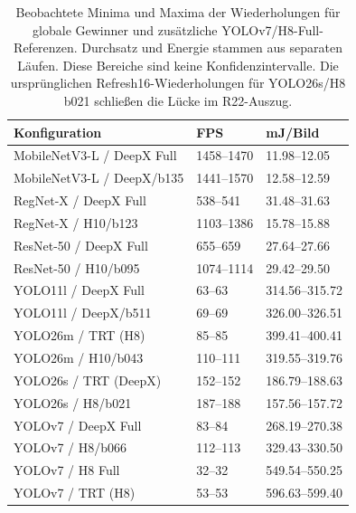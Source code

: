 \begin{table}[t]
\centering
\caption{Beobachtete Minima und Maxima der Wiederholungen für globale Gewinner und zusätzliche YOLOv7/H8-Full-Referenzen. Durchsatz und Energie stammen aus separaten Läufen. Diese Bereiche sind keine Konfidenzintervalle. Die ursprünglichen Refresh16-Wiederholungen für YOLO26s/H8 b021 schließen die Lücke im R22-Auszug.}
\label{tab:winner-repeat-ranges}
\begingroup\small\setlength{\tabcolsep}{3pt}
\begin{tabular*}{\columnwidth}{@{\extracolsep{\fill}}l l l@{}}
\toprule
Konfiguration & FPS & mJ/Bild \\
\midrule
MobileNetV3-L / DeepX Full & 1458--1470 & 11.98--12.05 \\
MobileNetV3-L / DeepX/b135 & 1441--1570 & 12.58--12.59 \\
RegNet-X / DeepX Full & 538--541 & 31.48--31.63 \\
RegNet-X / H10/b123 & 1103--1386 & 15.78--15.88 \\
ResNet-50 / DeepX Full & 655--659 & 27.64--27.66 \\
ResNet-50 / H10/b095 & 1074--1114 & 29.42--29.50 \\
YOLO11l / DeepX Full & 63--63 & 314.56--315.72 \\
YOLO11l / DeepX/b511 & 69--69 & 326.00--326.51 \\
YOLO26m / TRT (H8) & 85--85 & 399.41--400.41 \\
YOLO26m / H10/b043 & 110--111 & 319.55--319.76 \\
YOLO26s / TRT (DeepX) & 152--152 & 186.79--188.63 \\
YOLO26s / H8/b021 & 187--188 & 157.56--157.72 \\
YOLOv7 / DeepX Full & 83--84 & 268.19--270.38 \\
YOLOv7 / H8/b066 & 112--113 & 329.43--330.50 \\
YOLOv7 / H8 Full & 32--32 & 549.54--550.25 \\
YOLOv7 / TRT (H8) & 53--53 & 596.63--599.40 \\
\bottomrule
\end{tabular*}
\endgroup
\end{table}

